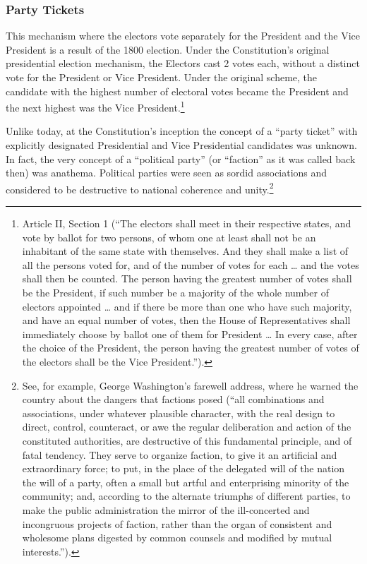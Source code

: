 \subsubsection{Party Tickets}
This mechanism where the electors vote separately for the President and the Vice President is a result of the 1800 election.  
Under the Constitution's original presidential election mechanism, the Electors cast 2 votes each, without a distinct vote for the President or Vice President.  Under the original scheme, the candidate with the highest number of electoral votes became the President and the next highest was the Vice President.\footnote{Article II, Section 1 (``The electors shall meet in their respective states, and vote by ballot for two persons, of whom one at least shall not be an inhabitant of the same state with themselves. And they shall make a list of all the persons voted for, and of the number of votes for each … and the votes shall then be counted. The person having the greatest number of votes shall be the President, if such number be a majority of the whole number of electors appointed … and if there be more than one who have such majority, and have an equal number of votes, then the House of Representatives shall immediately choose by ballot one of them for President … In every case, after the choice of the President, the person having the greatest number of votes of the electors shall be the Vice President.'').}

Unlike today, at the Constitution's inception the concept of a ``party ticket'' with explicitly designated Presidential and Vice Presidential candidates was unknown.  In fact, the very concept of a ``political party'' (or ``faction'' as it was called back then) was anathema.  Political parties were seen as sordid associations and considered to be destructive to national coherence and unity.\footnote{See, for example, George Washington's farewell address, where he warned the country about the dangers that factions posed (``all combinations and associations, under whatever plausible character, with the real design to direct, control, counteract, or awe the regular deliberation and action of the constituted authorities, are destructive of this fundamental principle, and of fatal tendency. They serve to organize faction, to give it an artificial and extraordinary force; to put, in the place of the delegated will of the nation the will of a party, often a small but artful and enterprising minority of the community; and, according to the alternate triumphs of different parties, to make the public administration the mirror of the ill-concerted and incongruous projects of faction, rather than the organ of consistent and wholesome plans digested by common counsels and modified by mutual interests.'').}

